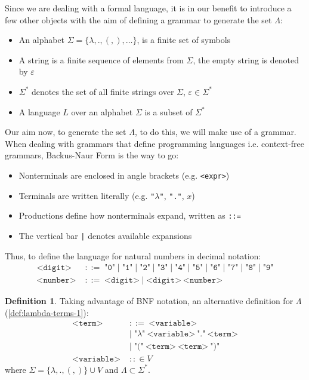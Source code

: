 \documentclass[12pt]{book}
\newcommand{\la}{\lambda}
\newcommand{\La}{\Lambda}
\newcommand{\Vset}{V}
\theoremstyle{plain}
\theoremstyle{definition}
\newtheorem{definition}{Definition}[section]
\theoremstyle{definition}
\theoremstyle{definition}
\begin{document}
Since we are dealing with a formal language, it is in our benefit to introduce a few other objects with the aim of defining a grammar to generate the set $\La$:
\begin{itemize}
\item An alphabet \( \Sigma = \{ \la, ., (, ), \ldots \} \), is a finite set of symbols
\item A string is a finite sequence of elements from \( \Sigma \), the empty string is denoted by \( \varepsilon \)
\item \( \Sigma^* \) denotes the set of all finite strings over \( \Sigma \), \( \varepsilon \in \Sigma^* \)
\item A language \( L \) over an alphabet \( \Sigma \) is a subset of \( \Sigma^* \)
\end{itemize}
Our aim now, to generate the set $\La$,  to do this, we will make use of a grammar. When dealing with grammars that define programming languages i.e. context-free grammars, Backus-Naur Form is the way to go:
\begin{itemize}
\item Nonterminals are enclosed in angle brackets (e.g. \texttt{<expr>})
\item Terminals are written literally (e.g. \texttt{"$\lambda$"}, \texttt{"."}, $x$)
\item Productions define how nonterminals expand, written as \texttt{::=}
\item The vertical bar \texttt{|} denotes available expansions
\end{itemize}
Thus, to define the language for natural numbers in decimal notation:
\begin{align*}
  \texttt{<digit>} &\;::=\; \texttt{"0"} \;|\; \texttt{"1"} \;|\; \texttt{"2"} \;|\; \texttt{"3"} \;|\; \texttt{"4"} \;|\; \texttt{"5"} \;|\; \texttt{"6"} \;|\; \texttt{"7"} \;|\; \texttt{"8"} \;|\; \texttt{"9"} \\
  \texttt{<number>} &\;::=\; \texttt{<digit>} \;|\; \texttt{<digit>} \ \texttt{<number>}
\end{align*}
\begin{definition} Taking advantage of BNF notation, an alternative definition for $\La$ (\ref{def:lambda-terms-1}):
  \begin{align*}
    \texttt{<term>} &\;::=\; \texttt{<variable>} \\
                    &\;|\; \texttt{"$\la$"}\ \texttt{<variable>}\ \texttt{"."}\ \texttt{<term>} \\
                    &\;|\; \texttt{"("}\ \texttt{<term>}\ \texttt{<term>}\ \texttt{")"} \\
    \texttt{<variable>} &\;::\in V
  \end{align*}
  \label{def:lambda-terms-2}
  where \( \Sigma = \{ \la, ., (, )\} \cup \Vset \) and \( \La \subset \Sigma^* \).
\end{definition}
\end{document}

